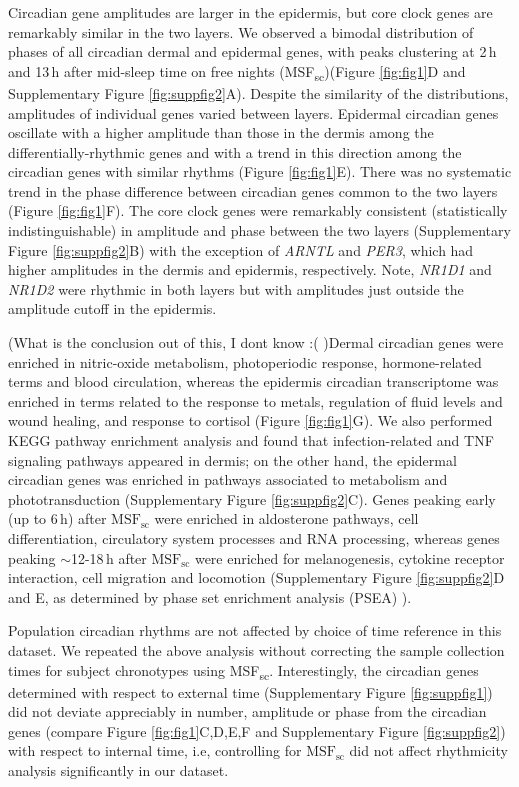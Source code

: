 Circadian gene amplitudes are larger in the epidermis, but core clock genes are remarkably similar in the two layers. We observed a bimodal distribution of phases of all circadian dermal and epidermal genes, with peaks clustering at 2\,h and 13\,h after mid-sleep time on free nights (MSF\textsubscript{sc})(Figure \ref{fig:fig1}D and Supplementary Figure \ref{fig:suppfig2}A). Despite the similarity of the distributions, amplitudes of individual genes varied between layers. Epidermal circadian genes oscillate with a higher amplitude than those in the dermis among the differentially-rhythmic genes and with a trend in this direction among the circadian genes with similar rhythms (Figure \ref{fig:fig1}E). There was no systematic trend in the phase difference between circadian genes common to the two layers (Figure \ref{fig:fig1}F). The core clock genes were remarkably consistent (statistically indistinguishable) in amplitude and phase between the two layers (Supplementary Figure \ref{fig:suppfig2}B) with the exception of \textit{ARNTL} and \textit{PER3}, which had higher amplitudes in the dermis and epidermis, respectively. Note, \textit{NR1D1} and \textit{NR1D2} were rhythmic in both layers but with amplitudes just outside the amplitude cutoff in the epidermis.

(What is the conclusion out of this, I dont know :( )Dermal circadian genes were enriched in nitric-oxide metabolism, photoperiodic response, hormone-related terms and blood circulation, whereas the epidermis circadian transcriptome was enriched in terms related to the response to metals, regulation of fluid levels and wound healing, and response to cortisol (Figure \ref{fig:fig1}G). We also performed KEGG pathway enrichment analysis and found that infection-related and TNF signaling pathways appeared in dermis; on the other hand, the epidermal circadian genes was enriched in pathways associated to metabolism and phototransduction (Supplementary Figure \ref{fig:suppfig2}C). Genes peaking early (up to 6\,h) after $\textrm{MSF}_\textrm{sc}$ were enriched in aldosterone pathways, cell differentiation, circulatory system processes and RNA processing, whereas genes peaking $\sim$12-18\,h after $\textrm{MSF}_\textrm{sc}$ were enriched for melanogenesis, cytokine receptor interaction, cell migration and locomotion (Supplementary Figure \ref{fig:suppfig2}D and E, as determined by phase set enrichment analysis (PSEA) \cite{Zhang2016}).

Population circadian rhythms are not affected by choice of time reference in this dataset. We repeated the above analysis without correcting the sample collection times for subject chronotypes using MSF\textsubscript{sc}. Interestingly, the circadian genes determined with respect to external time (Supplementary Figure \ref{fig:suppfig1}) did not deviate appreciably in number, amplitude or phase from the circadian genes (compare Figure \ref{fig:fig1}C,D,E,F and Supplementary Figure \ref{fig:suppfig2}) with respect to internal time, i.e, controlling for $\textrm{MSF}_\textrm{sc}$ did not affect rhythmicity analysis significantly in our dataset.  

